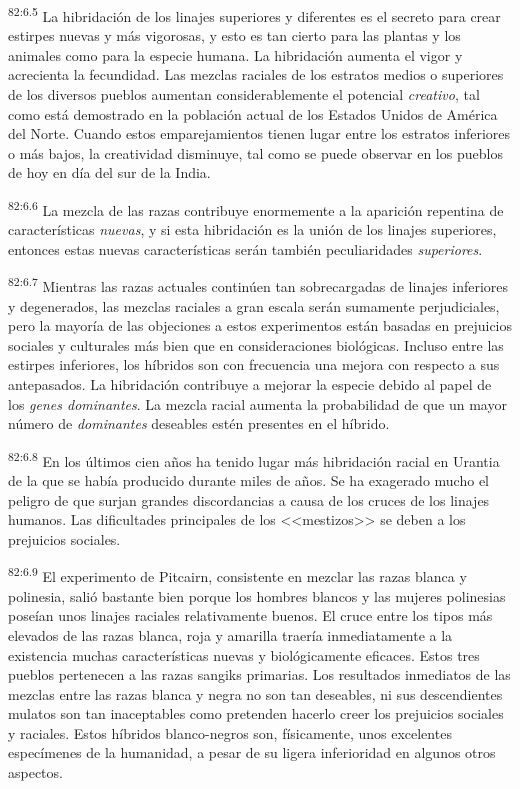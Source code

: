 \documentclass[twoside, 11pt]{book}
\begin{document}
\par
\textsuperscript{82:6.5} La hibridación de los linajes superiores y diferentes es el secreto para crear estirpes nuevas y más vigorosas, y esto es tan cierto para las plantas y los animales como para la especie humana. La hibridación aumenta el vigor y acrecienta la fecundidad. Las mezclas raciales de los estratos medios o superiores de los diversos pueblos aumentan considerablemente el potencial \textit{creativo}, tal como está demostrado en la población actual de los Estados Unidos de América del Norte. Cuando estos emparejamientos tienen lugar entre los estratos inferiores o más bajos, la creatividad disminuye, tal como se puede observar en los pueblos de hoy en día del sur de la India.

\par
\textsuperscript{82:6.6} La mezcla de las razas contribuye enormemente a la aparición repentina de características \textit{nuevas}, y si esta hibridación es la unión de los linajes superiores, entonces estas nuevas características serán también peculiaridades \textit{superiores}.

\par
\textsuperscript{82:6.7} Mientras las razas actuales continúen tan sobrecargadas de linajes inferiores y degenerados, las mezclas raciales a gran escala serán sumamente perjudiciales, pero la mayoría de las objeciones a estos experimentos están basadas en prejuicios sociales y culturales más bien que en consideraciones biológicas. Incluso entre las estirpes inferiores, los híbridos son con frecuencia una mejora con respecto a sus antepasados. La hibridación contribuye a mejorar la especie debido al papel de los \textit{genes dominantes}. La mezcla racial aumenta la probabilidad de que un mayor número de \textit{dominantes} deseables estén presentes en el híbrido.

\par
\textsuperscript{82:6.8} En los últimos cien años ha tenido lugar más hibridación racial en Urantia de la que se había producido durante miles de años. Se ha exagerado mucho el peligro de que surjan grandes discordancias a causa de los cruces de los linajes humanos. Las dificultades principales de los <<mestizos>> se deben a los prejuicios sociales.

\par
\textsuperscript{82:6.9} El experimento de Pitcairn, consistente en mezclar las razas blanca y polinesia, salió bastante bien porque los hombres blancos y las mujeres polinesias poseían unos linajes raciales relativamente buenos. El cruce entre los tipos más elevados de las razas blanca, roja y amarilla traería inmediatamente a la existencia muchas características nuevas y biológicamente eficaces. Estos tres pueblos pertenecen a las razas sangiks primarias. Los resultados inmediatos de las mezclas entre las razas blanca y negra no son tan deseables, ni sus descendientes mulatos son tan inaceptables como pretenden hacerlo creer los prejuicios sociales y raciales. Estos híbridos blanco-negros son, físicamente, unos excelentes especímenes de la humanidad, a pesar de su ligera inferioridad en algunos otros aspectos.
\end{document}
